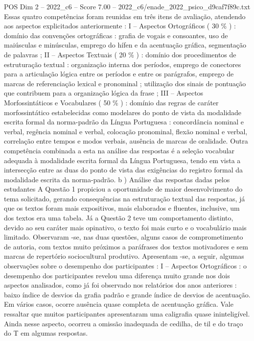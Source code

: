 \begin{textsample}{POS Dim 2 – 2022\_c6 – Score 7.00 – 2022\_c6/enade\_2022\_psico\_d9caf7f89c.txt}
Essas quatro competências foram reunidas em três itens de avaliação, atendendo aos aspectos explicitados anteriormente : I – Aspectos Ortográficos ( 30 \% ) : domínio das convenções ortográficas : grafia de vogais e consoantes, uso de maiúsculas e minúsculas, emprego do hífen e da acentuação gráfica, segmentação de palavras ; II – Aspectos Textuais ( 20 \% ) : domínio dos procedimentos de estruturação textual : organização interna dos períodos, emprego de conectores para a articulação lógica entre os períodos e entre os parágrafos, emprego de marcas de referenciação lexical e pronominal ; utilização dos sinais de pontuação que contribuem para a organização lógica da frase ; III – Aspectos Morfossintáticos e Vocabulares ( 50 \% ) : domínio das regras de caráter morfossintático estabelecidas como modelares do ponto de vista da modalidade escrita formal da norma-padrão da Língua Portuguesa : concordância nominal e verbal, regência nominal e verbal, colocação pronominal, flexão nominal e verbal, correlação entre tempos e modos verbais, ausência de marcas de oralidade.
Outra competência combinada a esta na análise das respostas é a seleção vocabular adequada à modalidade escrita formal da Língua Portuguesa, tendo em vista a intersecção entre as duas do ponto de vista das exigências do registro formal da modalidade escrita da norma-padrão. b ) Análise das respostas dadas pelos estudantes A Questão 1 propiciou a oportunidade de maior desenvolvimento do tema solicitado, gerando consequências na estruturação textual das respostas, já que os textos foram mais expositivos, mais elaborados e fluentes, inclusive, um dos textos era uma tabela.
Já a Questão 2 teve um comportamento distinto, devido ao seu caráter mais opinativo, o texto foi mais curto e o vocabulário mais limitado.
Observaram -se, nas duas questões, alguns casos de comprometimento de autoria, com textos muito próximos a paráfrases dos textos motivadores e sem marcas de repertório sociocultural produtivo.
Apresentam -se, a seguir, algumas observações sobre o desempenho dos participantes : I – Aspectos Ortográficos : o desempenho dos participantes revelou uma diferença muito grande nos dois aspectos analisados, como já foi observado nos relatórios dos anos anteriores : baixo índice de desvios da grafia padrão e grande índice de desvios de acentuação.
Em vários casos, ocorre ausência quase completa de acentuação gráfica.
Vale ressaltar que muitos participantes apresentaram uma caligrafia quase ininteligível.
Ainda nesse aspecto, ocorreu a omissão inadequada de cedilha, de til e do traço do T em algumas respostas.

\end{textsample}

